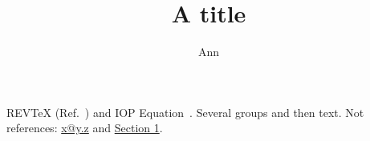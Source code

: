 \title{A title}
\author{Ann}
REVTeX (Ref.~) and IOP Equation~.
Several \cites[see][]{a}[p.~3]{b} {c} groups and then text.
Not references: \href{mailto:x@y.z}{x@y.z} and \hyperref[sec:a]{Section 1}.
